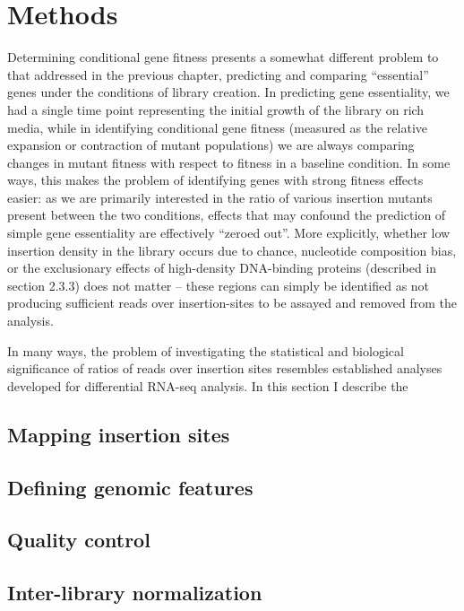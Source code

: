 \section{Methods}

Determining conditional gene fitness presents a somewhat different problem to that addressed in the previous chapter, predicting and comparing ``essential'' genes under the conditions of library creation. In predicting gene essentiality, we had a single time point representing the initial growth of the library on rich media, while in identifying conditional gene fitness (measured as the relative expansion or contraction of mutant populations) we are always comparing changes in mutant fitness with respect to fitness in a baseline condition. In some ways, this makes the problem of identifying genes with strong fitness effects easier: as we are primarily interested in the ratio of various insertion mutants present between the two conditions, effects that may confound the prediction of simple gene essentiality are effectively ``zeroed out''. More explicitly, whether low insertion density in the library occurs due to chance, nucleotide composition bias, or the exclusionary effects of high-density DNA-binding proteins (described in section 2.3.3) does not matter -- these regions can simply be identified as not producing sufficient reads over insertion-sites to be assayed and removed from the analysis.

In many ways, the problem of investigating the statistical and biological significance of ratios of reads over insertion sites resembles established analyses developed for differential RNA-seq analysis. In this section I describe the

\subsection{Mapping insertion sites}

\subsection{Defining genomic features}

\subsection{Quality control}

\subsection{Inter-library normalization}

